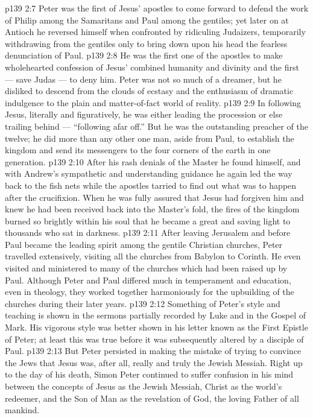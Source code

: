 \vs p139 2:7 Peter was the first of Jesus’ apostles to come forward to defend the work of Philip among the Samaritans and Paul among the gentiles; yet later on at Antioch he reversed himself when confronted by ridiculing Judaizers, temporarily withdrawing from the gentiles only to bring down upon his head the fearless denunciation of Paul.
\vs p139 2:8 He was the first one of the apostles to make wholehearted confession of Jesus’ combined humanity and divinity and the first --- save Judas --- to deny him. Peter was not so much of a dreamer, but he disliked to descend from the clouds of ecstasy and the enthusiasm of dramatic indulgence to the plain and matter\hyp{}of\hyp{}fact world of reality.
\vs p139 2:9 In following Jesus, literally and figuratively, he was either leading the procession or else trailing behind --- “following afar off.” But he was the outstanding preacher of the twelve; he did more than any other one man, aside from Paul, to establish the kingdom and send its messengers to the four corners of the earth in one generation.
\vs p139 2:10 After his rash denials of the Master he found himself, and with Andrew’s sympathetic and understanding guidance he again led the way back to the fish nets while the apostles tarried to find out what was to happen after the crucifixion. When he was fully assured that Jesus had forgiven him and knew he had been received back into the Master’s fold, the fires of the kingdom burned so brightly within his soul that he became a great and saving light to thousands who sat in darkness.
\vs p139 2:11 \pc After leaving Jerusalem and before Paul became the leading spirit among the gentile Christian churches, Peter travelled extensively, visiting all the churches from Babylon to Corinth. He even visited and ministered to many of the churches which had been raised up by Paul. Although Peter and Paul differed much in temperament and education, even in theology, they worked together harmoniously for the upbuilding of the churches during their later years.
\vs p139 2:12 \pc Something of Peter’s style and teaching is shown in the sermons partially recorded by Luke and in the Gospel of Mark. His vigorous style was better shown in his letter known as the First Epistle of Peter; at least this was true before it was subsequently altered by a disciple of Paul.
\vs p139 2:13 But Peter persisted in making the mistake of trying to convince the Jews that Jesus was, after all, really and truly the Jewish Messiah. Right up to the day of his death, Simon Peter continued to suffer confusion in his mind between the concepts of Jesus as the Jewish Messiah, Christ as the world’s redeemer, and the Son of Man as the revelation of God, the loving Father of all mankind.
